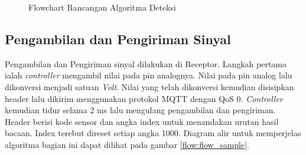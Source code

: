 \begin{figure}[H]
	\centering
    \caption{Flowchart Rancangan Algoritma Deteksi}
	\label{flow:fig_detect_algorithm}
\end{figure}

\subsection{Pengambilan dan Pengiriman Sinyal}
Pengambilan dan Pengiriman sinyal dilakukan di Receptor. Langkah pertama ialah \textit{controller} mengambil nilai pada pin analognya. Nilai pada pin analog lalu dikonversi menjadi satuan \textit{Volt}. Nilai yang telah dikonversi kemudian disisipkan header lalu dikirim  menggunakan protokol MQTT dengan QoS 0. \textit{Controller} kemudian tidur selama 2 ms lalu mengulang pengambilan dan pengiriman. Header berisi kode sensor dan angka index untuk menandakan urutan hasil bacaan. Index terebut direset setiap angka 1000. Diagram alir untuk memperjelas algoritma bagian ini dapat dilihat pada gambar \ref{flow:flow_sample}.

